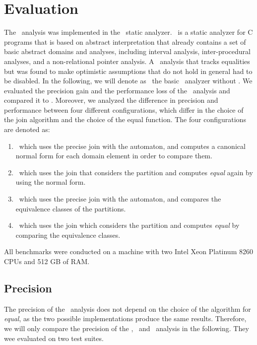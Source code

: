 \chapter{Evaluation}\label{chapter:evaluation}


The \cpo\ analysis was implemented in the \goblint\ static analyzer.
\goblint\ is a static analyzer for C programs that is based on abstract interpretation
that already contains a set of basic abstract domains and analyses,
including interval analysis, inter-procedural analyses, and a non-relational pointer analysis.
A \goblint\ analysis that tracks equalities but was found to make optimistic assumptions that do not hold in general had to be disabled.
In the following, we will denote as \base\ the basic \goblint\ analyzer without \cpo.
We evaluated the precision gain and the performance loss of the \cpo\ analysis and compared it to \base.
Moreover, we analyzed the difference in precision and performance between four different
configurations, which differ in the choice of the join algorithm and the choice of the equal function.
The four configurations are denoted as:
\begin{enumerate}
\item \cpou\, which uses the precise join with the automaton, and computes a canonical normal form for each domain element in order to compare them.
\item \cpod\, which uses the join that considers the partition and computes \emph{equal} again by using the normal form.
\item \cpot\, which uses the precise join with the automaton, and compares the equivalence classes of the partitions.
\item \cpoq\, which uses the join which considers the partition and computes \emph{equal} by comparing the equivalence classes.
\end{enumerate}
All benchmarks were conducted on a machine with two Intel Xeon Platinum 8260 CPUs and 512 GB of RAM.

\section{Precision}

The precision of the \cpo\ analysis does not depend on the choice of the algorithm for \emph{equal}, as the two possible implementations produce the same results.
Therefore, we will only compare the precision of the \cpou, \cpod\ and \base\ analysis in the following.
They wee evaluated on two test suites.

